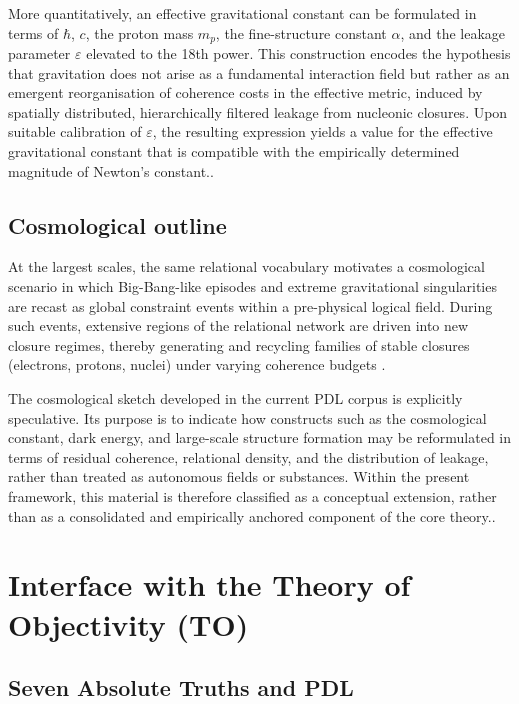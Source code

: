 \documentclass{article}
\begin{document}
More quantitatively, an effective gravitational constant can be formulated in terms of \(\hbar\), \(c\), the proton mass \(m_p\), the fine-structure constant \(\alpha\), and the leakage parameter \(\varepsilon\) elevated to the 18th power. This construction encodes the hypothesis that gravitation does not arise as a fundamental interaction field but rather as an emergent reorganisation of coherence costs in the effective metric, induced by spatially distributed, hierarchically filtered leakage from nucleonic closures. Upon suitable calibration of \(\varepsilon\), the resulting expression yields a value for the effective gravitational constant that is compatible with the empirically determined magnitude of Newton’s constant.\cite{Exponent_18_PDL_2026,Coherence_Leakage_18_2026,PDL_position}.

\subsection{Cosmological outline}
\label{subsec:cosmology_outline}

At the largest scales, the same relational vocabulary motivates a cosmological scenario in which Big-Bang-like episodes and extreme gravitational singularities are recast as global constraint events within a pre-physical logical field. During such events, extensive regions of the relational network are driven into new closure regimes, thereby generating and recycling families of stable closures (electrons, protons, nuclei) under varying coherence budgets \cite{PDL_Main_2026,PDL_position}.

The cosmological sketch developed in the current PDL corpus is explicitly
speculative. Its purpose is to indicate how constructs such as the cosmological constant, dark energy, and large-scale structure formation may be reformulated in terms of residual coherence, relational density, and the distribution of leakage, rather than treated as autonomous fields or substances. Within the present framework, this material is therefore classified as a conceptual extension, rather than as a consolidated and empirically anchored component of the core theory.\cite{PDL_Main_2026,PDL_position}.

\section{Interface with the Theory of Objectivity (TO)}
\label{sec:TO_interface}

\subsection{Seven Absolute Truths and PDL}
\label{subsec:TO_Axioms}
\end{document}
